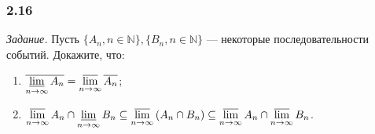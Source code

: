 \subsubsection*{2.16}

\textit{Задание.} Пусть $ \{ A_n, n \in \mathbb{ N } \}, \{ B_n, n \in \mathbb{ N } \}$ --- некоторые последовательности событий.
Докажите, что:
\begin{enumerate}[label=\alph*)]
\item $ \overline{ \varliminf \limits_{ n \to \infty } A_n } =
\varlimsup \limits_{ n \to \infty } \overline{ A_n }$;

\item $ \varlimsup \limits_{ n \to \infty } A_n \cap \varliminf \limits_{ n \to \infty } B_n \subseteq
\varlimsup \limits_{ n \to \infty } \left( A_n \cap B_n \right) \subseteq
\varlimsup \limits_{ n \to \infty } A_n \cap \varlimsup \limits_{ n \to \infty } B_n $.
\end{enumerate}

